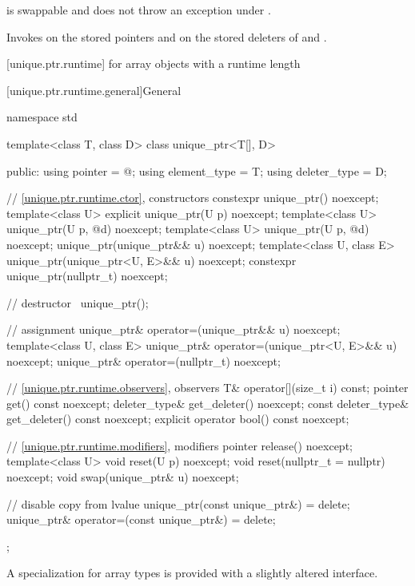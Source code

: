 \begin{itemdescr}
\pnum
\expects
{} is swappable and
does not throw an exception under .

\pnum
\effects
Invokes  on the stored pointers and on the stored
deleters of  and .
\end{itemdescr}

[unique.ptr.runtime]{ for array objects with a runtime length}

[unique.ptr.runtime.general]{General}

%
\begin{codeblock}
namespace std {
  template<class T, class D> class unique_ptr<T[], D> {
  public:
    using pointer      = @\seebelow@;
    using element_type = T;
    using deleter_type = D;

    // \ref{unique.ptr.runtime.ctor}, constructors
    constexpr unique_ptr() noexcept;
    template<class U> explicit unique_ptr(U p) noexcept;
    template<class U> unique_ptr(U p, @\seebelow@ d) noexcept;
    template<class U> unique_ptr(U p, @\seebelow@ d) noexcept;
    unique_ptr(unique_ptr&& u) noexcept;
    template<class U, class E>
      unique_ptr(unique_ptr<U, E>&& u) noexcept;
    constexpr unique_ptr(nullptr_t) noexcept;

    // destructor
    ~unique_ptr();

    // assignment
    unique_ptr& operator=(unique_ptr&& u) noexcept;
    template<class U, class E>
      unique_ptr& operator=(unique_ptr<U, E>&& u) noexcept;
    unique_ptr& operator=(nullptr_t) noexcept;

    // \ref{unique.ptr.runtime.observers}, observers
    T& operator[](size_t i) const;
    pointer get() const noexcept;
    deleter_type& get_deleter() noexcept;
    const deleter_type& get_deleter() const noexcept;
    explicit operator bool() const noexcept;

    // \ref{unique.ptr.runtime.modifiers}, modifiers
    pointer release() noexcept;
    template<class U> void reset(U p) noexcept;
    void reset(nullptr_t = nullptr) noexcept;
    void swap(unique_ptr& u) noexcept;

    // disable copy from lvalue
    unique_ptr(const unique_ptr&) = delete;
    unique_ptr& operator=(const unique_ptr&) = delete;
  };
}
\end{codeblock}

\pnum
A specialization for array types is provided with a slightly altered
interface.

